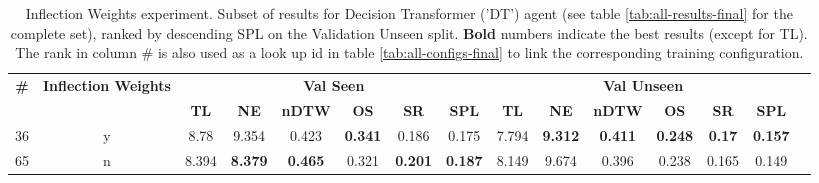 \begin{table}
\centering
\caption{\label{tab:inflection_weights}Inflection Weights experiment. Subset of results for Decision Transformer ('DT') agent (see table \ref{tab:all-results-final} for the complete set), ranked by descending SPL on the Validation Unseen split. \textbf{Bold} numbers indicate the best results (except for TL). The rank in column \# is also used as a look up id in table \ref{tab:all-configs-final} to link the corresponding training configuration.}
\begin{tabular}{@{\hskip3pt}c@{\hskip3pt}c@{\hskip3pt}c@{\hskip3pt}c@{\hskip3pt}c@{\hskip3pt}c@{\hskip3pt}c@{\hskip3pt}c@{\hskip3pt}c@{\hskip3pt}c@{\hskip3pt}c@{\hskip3pt}c@{\hskip3pt}c@{\hskip3pt}c@{\hskip3pt}c}
\toprule
                                  \textbf{\#} & \textbf{Inflection Weights} & \multicolumn{6}{c}{\textbf{Val Seen}} & \multicolumn{6}{c}{\textbf{Val Unseen}} \\
\cmidrule(l){3-8}\cmidrule(l){9-14}\textbf{~} &                  \textbf{~} &       \textbf{TL} &     \textbf{NE} &   \textbf{nDTW} &     \textbf{OS} &     \textbf{SR} &    \textbf{SPL} &         \textbf{TL} &     \textbf{NE} &   \textbf{nDTW} &     \textbf{OS} &    \textbf{SR} &    \textbf{SPL} \\
\midrule
                                           36 &                           y &              8.78 &           9.354 &           0.423 &  \textbf{0.341} &           0.186 &           0.175 &               7.794 &  \textbf{9.312} &  \textbf{0.411} &  \textbf{0.248} &  \textbf{0.17} &  \textbf{0.157} \\
                                           65 &                           n &             8.394 &  \textbf{8.379} &  \textbf{0.465} &           0.321 &  \textbf{0.201} &  \textbf{0.187} &               8.149 &           9.674 &           0.396 &           0.238 &          0.165 &           0.149 \\
\bottomrule
\end{tabular}
\end{table}

